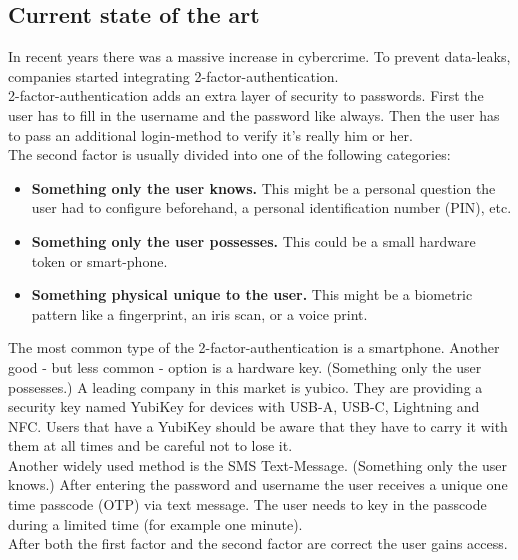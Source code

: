 \documentclass[conference]{IEEEtran}
\begin{document}
\subsection{Current state of the art}
In recent years there was a massive increase in cybercrime. To prevent data-leaks, companies started integrating 2-factor-authentication.\cite{b4}\\
2-factor-authentication adds an extra layer of security to passwords. First the user has to fill in the username and the password like always. Then the user has to pass an additional login-method to verify it's really him or her.\\
The second factor is usually divided into one of the following categories:
\begin{itemize}
    \item \textbf{Something only the user knows.}  This might be a personal question the user had to configure beforehand, a personal identification number (PIN), etc.
    \item \textbf{Something only the user possesses.} This could be a small hardware token or smart-phone.
    \item \textbf{Something physical unique to the user.} This might be a  biometric pattern like a fingerprint, an iris scan, or a voice print.
\end{itemize}
The most common type of the 2-factor-authentication is a smartphone. Another good - but less common - option is a hardware key. (Something only the user possesses.) A leading company in this market is yubico. They are providing a security key named YubiKey for devices with USB-A, USB-C, Lightning and NFC. Users that have a YubiKey should be aware that they have to carry it with them at all times and be careful not to lose it.\cite{b11}\\
Another widely used method is the SMS Text-Message. (Something only the user knows.) After entering the password and username the user receives a unique one time passcode (OTP) via text message. The user needs to key in the passcode during a limited time (for example one minute).\\
After both the first factor and the second factor are correct the user gains access.
\end{document}

